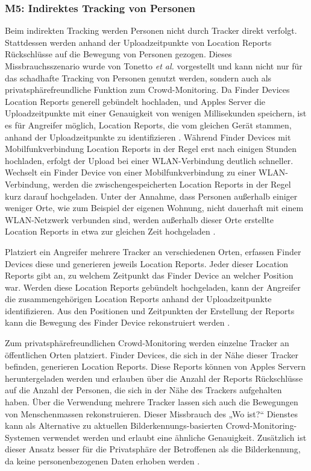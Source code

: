 \subsubsection[Szenario M5]{M5: Indirektes Tracking von Personen}
\label{missbrauch:5}
Beim indirekten Tracking werden Personen nicht durch Tracker direkt verfolgt.
Stattdessen werden anhand der Uploadzeitpunkte von Location Reports Rückschlüsse auf die Bewegung von Personen gezogen.
Dieses Missbrauchsszenario wurde von Tonetto \textit{et al.} \cite{Tonetto_FindMy} vorgestellt und kann nicht nur für das schadhafte Tracking von Personen genutzt werden, sondern auch als privatsphärefreundliche Funktion zum Crowd-Monitoring.
Da Finder Devices Location Reports generell gebündelt hochladen, und Apples Server die Uploadzeitpunkte mit einer Genauigkeit von wenigen Millisekunden speichern, ist es für Angreifer möglich, Location Reports, die vom gleichen Gerät stammen, anhand der Uploadzeitpunkte zu identifizieren \cite{Tonetto_FindMy}.
Während Finder Devices mit Mobilfunkverbindung Location Reports in der Regel erst nach einigen Stunden hochladen, erfolgt der Upload bei einer WLAN-Verbindung deutlich schneller.
Wechselt ein Finder Device von einer Mobilfunkverbindung zu einer WLAN-Verbindung, werden die zwischengespeicherten Location Reports in der Regel kurz darauf hochgeladen.
Unter der Annahme, dass Personen außerhalb einiger weniger Orte, wie zum Beispiel der eigenen Wohnung, nicht dauerhaft mit einem WLAN-Netzwerk verbunden sind, werden außerhalb dieser Orte erstellte Location Reports in etwa zur gleichen Zeit hochgeladen \cite{Tonetto_FindMy}.

Platziert ein Angreifer mehrere Tracker an verschiedenen Orten, erfassen Finder Devices diese und generieren jeweils Location Reports.
Jeder dieser Location Reports gibt an, zu welchem Zeitpunkt das Finder Device an welcher Position war.
Werden diese Location Reports gebündelt hochgeladen, kann der Angreifer die zusammengehörigen Location Reports anhand der Uploadzeitpunkte identifizieren.
Aus den Positionen und Zeitpunkten der Erstellung der Reports kann die Bewegung des Finder Device rekonstruiert werden \cite{Tonetto_FindMy}.


Zum privatsphärefreundlichen Crowd-Monitoring werden einzelne Tracker an öffentlichen Orten platziert.
Finder Devices, die sich in der Nähe dieser Tracker befinden, generieren Location Reports.
Diese Reports können von Apples Servern heruntergeladen werden und erlauben über die Anzahl der Reports Rückschlüsse auf die Anzahl der Personen, die sich in der Nähe des Trackers aufgehalten haben.
Über die Verwendung mehrere Tracker lassen sich auch die Bewegungen von Menschenmassen rekonstruieren.
Dieser Missbrauch des „Wo ist?“ Dienstes kann als Alternative zu aktuellen Bilderkennungs-basierten Crowd-Monitoring-Systemen verwendet werden und erlaubt eine ähnliche Genauigkeit.
Zusätzlich ist dieser Ansatz besser für die Privatsphäre der Betroffenen als die Bilderkennung, da keine personenbezogenen Daten erhoben werden \cite{Tonetto_FindMy}.


